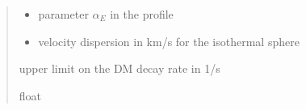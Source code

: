 \documentclass[letterpaper,10pt,english]{sphinxmanual}
\begin{document}
\begin{fulllineitems}
\begin{quote}
\begin{description}
\begin{itemize}
\item {} 
\sphinxAtStartPar
{} \textendash{} parameter \(\alpha_E\) in the {\hyperref[\detokenize{diffsph.profiles:diffsph.profiles.templates.enst}]{}} profile

\item {} 
\sphinxAtStartPar
{} \textendash{} velocity dispersion in km/s for the isothermal sphere {\hyperref[\detokenize{diffsph.profiles:diffsph.profiles.templates.sis}]{}}

\end{itemize}

\sphinxAtStartPar
upper limit on the DM decay rate in 1/s

\sphinxAtStartPar
float

\end{description}\end{quote}

\end{fulllineitems}

\end{document}
